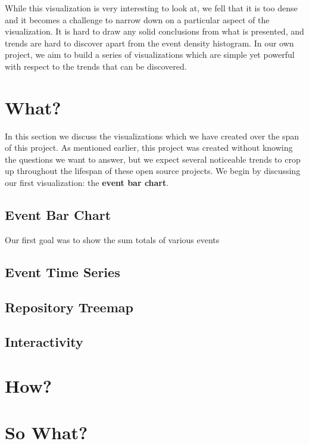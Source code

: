 \documentclass{article}
\begin{document}
While this visualization is very interesting to look at, we fell that it is too dense and it becomes a challenge to narrow down on a particular aspect of the visualization. It is hard to draw any solid conclusions from what is presented, and trends are hard to discover apart from the event density histogram. In our own project, we aim to build a series of visualizations which are simple yet powerful with respect to the trends that can be discovered.

\section {What?}

In this section we discuss the visualizations which we have created over the span of this project. As mentioned earlier, this project was created without knowing the questions we want to answer, but we expect several noticeable trends to crop up throughout the lifespan of these open source projects. We begin by discussing our first visualization: the \textbf{event bar chart}.

\subsection {Event Bar Chart}

Our first goal was to show the sum totals of various events 

\subsection {Event Time Series}

\subsection {Repository Treemap}

\subsection {Interactivity}

\section {How?}

\section {So What?}
\end{document}
